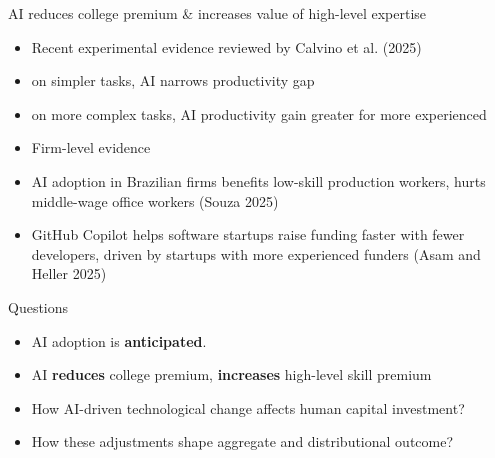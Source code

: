 \documentclass[serif, aspectratio=169]{beamer}
\theoremstyle{remark}
\theoremstyle{plain}
\begin{document}
\begin{frame}{AI reduces college premium \& increases value of high-level expertise} 
\begin{itemize}
    \item Recent experimental evidence reviewed by Calvino et al. (2025)
    \item[-] on simpler tasks, AI narrows productivity gap 
    \item[-] on more complex tasks, AI productivity gain greater for more experienced
    \medskip
    \item Firm-level evidence
    \item[-] AI adoption in Brazilian firms benefits low-skill production workers, hurts middle-wage office workers (Souza 2025)
    \item[-] GitHub Copilot helps software startups raise funding faster with fewer developers, driven by startups with more experienced funders (Asam and Heller 2025)
\end{itemize}

\end{frame}

\begin{frame}{Questions}
\begin{itemize}
    \item AI adoption is \textbf{anticipated}.
    \item AI \textbf{reduces} college premium, \textbf{increases} high-level skill premium

    \bigskip
    \item How AI-driven technological change affects human capital investment?
    \item How these adjustments shape aggregate and distributional outcome?





    
\end{itemize}

\end{frame}
\end{document}
